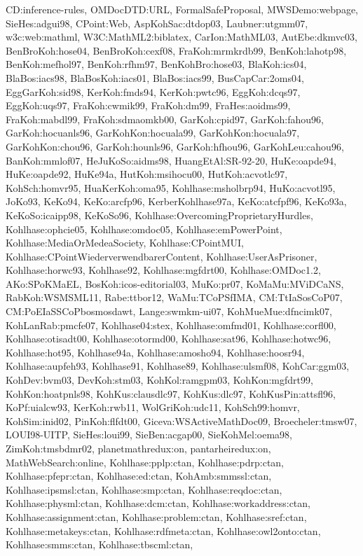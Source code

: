 {CD:inference-rules,
OMDocDTD:URL,
FormalSafeProposal,
MWSDemo:webpage,
SieHes:adgui98,
CPoint:Web,
AspKohSac:dtdop03,
Laubner:utgmm07,
w3c:web:mathml,
W3C:MathML2:biblatex,
CarIon:MathML03,
AutEbe:dkmvc03,
BenBroKoh:hose04,
BenBroKoh:cexf08,
FraKoh:mrmkrdb99,
BenKoh:lahotp98,
BenKoh:mefhol97,
BenKoh:rfhm97,
BenKohBro:hose03,
BlaKoh:ics04,
BlaBos:iacs98,
BlaBosKoh:iacs01,
BlaBos:iacs99,
BusCapCar:2oms04,
EggGarKoh:sid98,
KerKoh:fmds94,
KerKoh:pwtc96,
EggKoh:dcqs97,
EggKoh:uqs97,
FraKoh:cwmik99,
FraKoh:dm99,
FraHes:aoidms99,
FraKoh:mabdl99,
FraKoh:sdmaomkb00,
GarKoh:cpid97,
GarKoh:fahou96,
GarKoh:hocuanls96,
GarKohKon:hocuala99,
GarKohKon:hocuala97,
GarKohKon:chou96,
GarKoh:hounls96,
GarKoh:hfhou96,
GarKohLeu:cahou96,
BanKoh:mmlof07,
HeJuKoSo:aidms98,
HuangEtAl:SR-92-20,
HuKe:oapde94,
HuKe:oapde92,
HuKe94a,
HutKoh:msihocu00,
HutKoh:acvotlc97,
KohSch:homvr95,
HuaKerKoh:oma95,
Kohlhase:msholbrp94,
HuKo:acvotl95,
JoKo93,
KeKo94,
KeKo:arcfp96,
KerberKohlhase97a,
KeKo:atcfpf96,
KeKo93a,
KeKoSo:icaipp98,
KeKoSo96,
Kohlhase:OvercomingProprietaryHurdles,
Kohlhase:ophcie05,
Kohlhase:omdoc05,
Kohlhase:emPowerPoint,
Kohlhase:MediaOrMedeaSociety,
Kohlhase:CPointMUI,
Kohlhase:CPointWiederverwendbarerContent,
Kohlhase:UserAsPrisoner,
Kohlhase:horwc93,
Kohlhase92,
Kohlhase:mgfdrt00,
Kohlhase:OMDoc1.2,
AKo:SPoKMaEL,
BosKoh:icos-editorial03,
MuKo:pr07,
KoMaMu:MViDCaNS,
RabKoh:WSMSML11,
Rabe:ttbor12,
WaMu:TCoPSfIMA,
CM:TtIaSosCoP07,
CM:PoEIaSSCoPbosmosdawt,
Lange:swmkm-ui07,
KohMueMue:dfncimk07,
KohLanRab:pmcfe07,
Kohlhase04:stex,
Kohlhase:omfmd01,
Kohlhase:corfl00,
Kohlhase:otisadt00,
Kohlhase:otormd00,
Kohlhase:sat96,
Kohlhase:hotwc96,
Kohlhase:hot95,
Kohlhase94a,
Kohlhase:amosho94,
Kohlhase:hoosr94,
Kohlhase:aupfeh93,
Kohlhase91,
Kohlhase89,
Kohlhase:ulsmf08,
KohCar:ggm03,
KohDev:bvm03,
DevKoh:stm03,
KohKol:ramgpm03,
KohKon:mgfdrt99,
KohKon:hoatpnls98,
KohKus:clausdlc97,
KohKus:dlc97,
KohKusPin:attsfl96,
KoPf:uialcw93,
KerKoh:rwb11,
WolGriKoh:udc11,
KohSch99:homvr,
KohSim:inid02,
PinKoh:flfdt00,
Giceva:WSActiveMathDoc09,
Broecheler:tmsw07,
LOUI98-UITP,
SieHes:loui99,
SieBen:acgap00,
SieKohMel:oema98,
ZimKoh:tmsbdmr02,
planetmathredux:on,
pantarheiredux:on,
MathWebSearch:online,
Kohlhase:pplp:ctan,
Kohlhase:pdrp:ctan,
Kohlhase:pfepr:ctan,
Kohlhase:ed:ctan,
KohAmb:smmssl:ctan,
Kohlhase:ipsmsl:ctan,
Kohlhase:smp:ctan,
Kohlhase:reqdoc:ctan,
Kohlhase:physml:ctan,
Kohlhase:dcm:ctan,
Kohlhase:workaddress:ctan,
Kohlhase:assignment:ctan,
Kohlhase:problem:ctan,
Kohlhase:sref:ctan,
Kohlhase:metakeys:ctan,
Kohlhase:rdfmeta:ctan,
Kohlhase:owl2onto:ctan,
Kohlhase:smms:ctan,
Kohlhase:tbscml:ctan,
}
